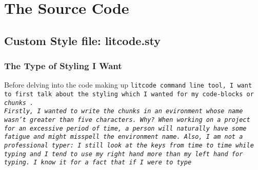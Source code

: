 \newpage
\chapter{The Source Code}
\section{Custom Style file: litcode.sty}
\subsection{The Type of Styling I Want}
Before delving into the code making up \tt litcode \rm command line tool, I want to first talk about the
styling which I wanted for my code-blocks or \it chunks \rm. \\
Firstly, I wanted to write the chunks in an evironment whose name wasn't greater than five characters. Why?
When working on a project for an excessive period of time, a person will naturally have some fatigue and might
misspell the environment name. Also, I am not a professional typer: I still look at the keys from time to time
while typing and I tend to use my right hand more than my left hand for typing. I know it for a fact that if I
were to type

